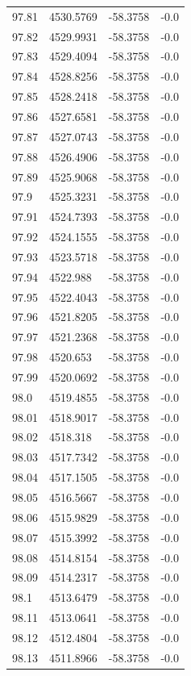\begin{table}[H]
\begin{tabular}{llll}
97.81 & 4530.5769 & -58.3758 & -0.0 \\
97.82 & 4529.9931 & -58.3758 & -0.0 \\
97.83 & 4529.4094 & -58.3758 & -0.0 \\
97.84 & 4528.8256 & -58.3758 & -0.0 \\
97.85 & 4528.2418 & -58.3758 & -0.0 \\
97.86 & 4527.6581 & -58.3758 & -0.0 \\
97.87 & 4527.0743 & -58.3758 & -0.0 \\
97.88 & 4526.4906 & -58.3758 & -0.0 \\
97.89 & 4525.9068 & -58.3758 & -0.0 \\
97.9 & 4525.3231 & -58.3758 & -0.0 \\
97.91 & 4524.7393 & -58.3758 & -0.0 \\
97.92 & 4524.1555 & -58.3758 & -0.0 \\
97.93 & 4523.5718 & -58.3758 & -0.0 \\
97.94 & 4522.988 & -58.3758 & -0.0 \\
97.95 & 4522.4043 & -58.3758 & -0.0 \\
97.96 & 4521.8205 & -58.3758 & -0.0 \\
97.97 & 4521.2368 & -58.3758 & -0.0 \\
97.98 & 4520.653 & -58.3758 & -0.0 \\
97.99 & 4520.0692 & -58.3758 & -0.0 \\
98.0 & 4519.4855 & -58.3758 & -0.0 \\
98.01 & 4518.9017 & -58.3758 & -0.0 \\
98.02 & 4518.318 & -58.3758 & -0.0 \\
98.03 & 4517.7342 & -58.3758 & -0.0 \\
98.04 & 4517.1505 & -58.3758 & -0.0 \\
98.05 & 4516.5667 & -58.3758 & -0.0 \\
98.06 & 4515.9829 & -58.3758 & -0.0 \\
98.07 & 4515.3992 & -58.3758 & -0.0 \\
98.08 & 4514.8154 & -58.3758 & -0.0 \\
98.09 & 4514.2317 & -58.3758 & -0.0 \\
98.1 & 4513.6479 & -58.3758 & -0.0 \\
98.11 & 4513.0641 & -58.3758 & -0.0 \\
98.12 & 4512.4804 & -58.3758 & -0.0 \\
98.13 & 4511.8966 & -58.3758 & -0.0 \\

\end{tabular}
\end{table}
